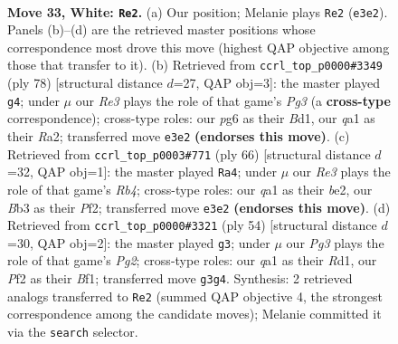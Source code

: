 \documentclass[11pt]{article}
\begin{document}
\clearpage

\begin{figure}[p]\centering
\begin{subfigure}{0.46\textwidth}\centering
\resizebox{\linewidth}{!}{%
\newchessgame
\chessboard[
  setfen={8/pp5p/6pk/8/8/bB2R1P1/5PKP/q7 w - - 0 33},
  showmover=false,
  pgfstyle=straightmove, color=movearrow, markmove={e3-e2}
]}
\caption{}
\end{subfigure}\hfill
\begin{subfigure}{0.46\textwidth}\centering
\resizebox{\linewidth}{!}{%
\newchessgame
\chessboard[
  setfen={4b3/5kpp/3r4/8/3p3P/6P1/R4PK1/3B4 w - - 2 40},
  showmover=false,
  pgfstyle=straightmove, color=movearrow, markmove={g3-g4}
]}
\caption{}
\end{subfigure}
\\[4pt]
\begin{subfigure}{0.46\textwidth}\centering
\resizebox{\linewidth}{!}{%
\newchessgame
\chessboard[
  setfen={8/1B3pkp/8/2r2p2/1R6/6P1/4bPKP/8 w - - 4 34},
  showmover=false,
  pgfstyle=straightmove, color=movearrow, markmove={b4-a4}
]}
\caption{}
\end{subfigure}\hfill
\begin{subfigure}{0.46\textwidth}\centering
\resizebox{\linewidth}{!}{%
\newchessgame
\chessboard[
  setfen={4r1k1/5p1p/2p2p2/8/8/b6P/5PP1/3R1BK1 w - - 0 28},
  showmover=false,
  pgfstyle=straightmove, color=movearrow, markmove={g2-g3}
]}
\caption{}
\end{subfigure}
\caption{\textbf{Move 33, White: \texttt{Re2}.} (a) Our position; Melanie plays \texttt{Re2} (\texttt{e3e2}). Panels (b)--(d) are the retrieved master positions whose correspondence most drove this move (highest QAP objective among those that transfer to it). (b) Retrieved from \texttt{ccrl\_top\_p0000\#3349} (ply 78) [structural distance $d$=27, QAP obj=3]: the master played \texttt{g4}; under $\mu$ our \emph{Re3} plays the role of that game's \emph{Pg3} (a \textbf{cross-type} correspondence); cross-type roles: our \emph{p}g6 as their \emph{B}d1, our \emph{q}a1 as their \emph{R}a2; transferred move \texttt{e3e2} \textbf{(endorses this move)}. (c) Retrieved from \texttt{ccrl\_top\_p0003\#771} (ply 66) [structural distance $d$=32, QAP obj=1]: the master played \texttt{Ra4}; under $\mu$ our \emph{Re3} plays the role of that game's \emph{Rb4}; cross-type roles: our \emph{q}a1 as their \emph{b}e2, our \emph{B}b3 as their \emph{P}f2; transferred move \texttt{e3e2} \textbf{(endorses this move)}. (d) Retrieved from \texttt{ccrl\_top\_p0000\#3321} (ply 54) [structural distance $d$=30, QAP obj=2]: the master played \texttt{g3}; under $\mu$ our \emph{Pg3} plays the role of that game's \emph{Pg2}; cross-type roles: our \emph{q}a1 as their \emph{R}d1, our \emph{P}f2 as their \emph{B}f1; transferred move \texttt{g3g4}. Synthesis: 2 retrieved analogs transferred to \texttt{Re2} (summed QAP objective 4, the strongest correspondence among the candidate moves); Melanie committed it via the \texttt{search} selector.}
\label{fig:thought-m64}
\end{figure}
\end{document}
